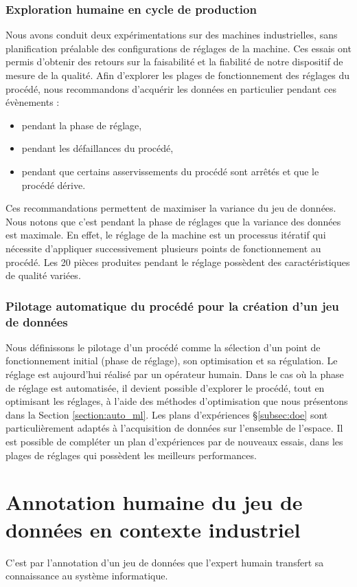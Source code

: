 \subsubsection{Exploration humaine en cycle de production}
Nous avons conduit deux expérimentations sur des machines industrielles, sans planification préalable des configurations de réglages de la machine.
Ces essais ont permis d'obtenir des retours sur la faisabilité et la fiabilité de notre dispositif de mesure de la qualité.
Afin d'explorer les plages de fonctionnement des réglages du procédé, nous recommandons d'acquérir les données en particulier pendant ces évènements :
\begin{itemize}
\item pendant la phase de réglage,
\item pendant les défaillances du procédé,
\item pendant que certains asservissements du procédé sont arrêtés et que le procédé dérive.
\end{itemize}
Ces recommandations permettent de maximiser la variance du jeu de données.
Nous notons que c'est pendant la phase de réglages que la variance des données est maximale.
En effet, le réglage de la machine est un processus itératif qui nécessite d'appliquer successivement plusieurs points de fonctionnement au procédé.
Les 20 pièces produites pendant le réglage possèdent des caractéristiques de qualité variées.

\subsubsection{Pilotage automatique du procédé pour la création d'un jeu de données}
Nous définissons le pilotage d'un procédé comme la sélection d'un point de fonctionnement initial (phase de réglage), son optimisation et sa régulation.
Le réglage est aujourd'hui réalisé par un opérateur humain.
Dans le cas où la phase de réglage est automatisée, il devient possible d'explorer le procédé, tout en optimisant les réglages, à l'aide des méthodes d'optimisation que nous présentons dans la Section \ref{section:auto_ml}.
Les plans d'expériences §\ref{subsec:doe} sont particulièrement adaptés à l'acquisition de données sur l'ensemble de l'espace.
Il est possible de compléter un plan d'expériences par de nouveaux essais, dans les plages de réglages qui possèdent les meilleurs performances.

\section{Annotation humaine du jeu de données en contexte industriel}
C'est par l'annotation d'un jeu de données que l'expert humain transfert sa connaissance au système informatique.

